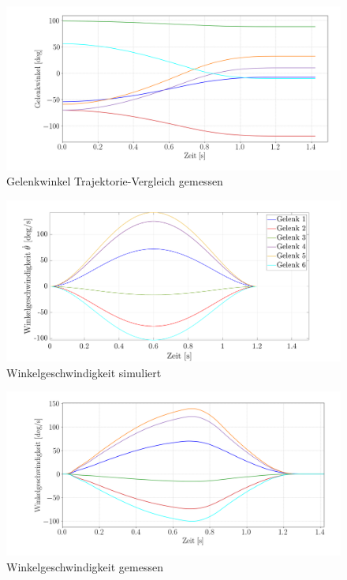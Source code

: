 %
\begin{figure}[]
	\centering
	\includegraphics[width=1\linewidth]{images/pos}
	\caption{Gelenkwinkel Trajektorie-Vergleich gemessen}
	\label{fig:gelenkwinkelpy}
\end{figure}
%
\newpage
\begin{figure}[]
	\centering
	\includegraphics[width=1\linewidth]{images/velmat}
	\caption{Winkelgeschwindigkeit  simuliert}
	\label{fig:winkelgeschwindigkeit}
\end{figure}
%
\begin{figure}[]
	\centering
	\includegraphics[width=1\linewidth]{images/vel}
	\caption{Winkelgeschwindigkeit  gemessen}
	\label{fig:winkelgeschwindigkeit_py1}
\end{figure}
